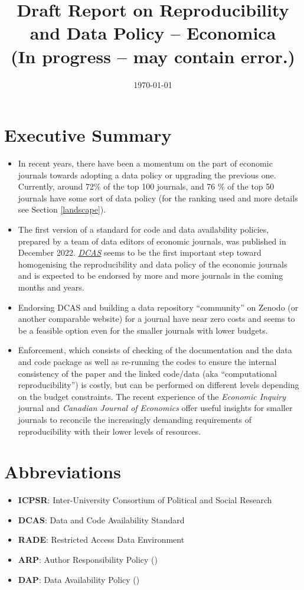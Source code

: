 \documentclass[11pt]{article}
\date{\today}
\title{\huge{Draft Report on Reproducibility and Data Policy -- Economica} \\ \vspace{5mm}\large(In progress -- may contain error.)}
\begin{document}
\maketitle
\tableofcontents
\newpage

\section*{Executive Summary}
\begin{itemize}
\item In recent years, there have been a momentum on the part of economic journals towards adopting a data policy or upgrading the previous one. Currently, around 72\% of the top 100 journals, and 76 \% of the top 50 journals have some sort of data policy (for the ranking used and more details see Section \ref{landscape}).
\item The first version of a standard for code and data availability policies, prepared by a team of data editors of economic journals, was published in December 2022. \href{https://datacodestandard.org/}{\textit{DCAS}} seems to be the first important step toward homogenising the reproducibility and data policy of the economic journals and is expected to be endorsed by more and more journals in the coming months and years.
\item Endorsing DCAS and building a data repository ``community'' on Zenodo (or another comparable website) for a journal have near zero costs and seems to be a feasible option even for the smaller journals with lower budgets.
\item Enforcement, which consists of checking of the documentation and the data and code package as well as re-running the codes to ensure the internal consistency of the paper and the linked code/data (aka ``computational reproducibility'') is costly, but can be performed on different levels depending on the budget constraints. The recent experience of the \textit{Economic Inquiry} journal and \textit{Canadian Journal of Economics} offer useful insights for smaller journals to reconcile the increasingly demanding requirements of reproducibility with their lower levels of resources.
\end{itemize}

\newpage
\section*{Abbreviations}
\begin{itemize}
	\item \textbf{ICPSR}: Inter-University Consortium of Political and Social Research
	\item \textbf{DCAS}: Data and Code Availability Standard
	\item \textbf{RADE}: Restricted Access Data Environment
        \item \textbf{ARP}: Author Responsibility Policy (\cite{vlaeminck2015data})
        \item \textbf{DAP}: Data Availability Policy (\cite{vlaeminck2015data})
\end{itemize}
\end{document}

